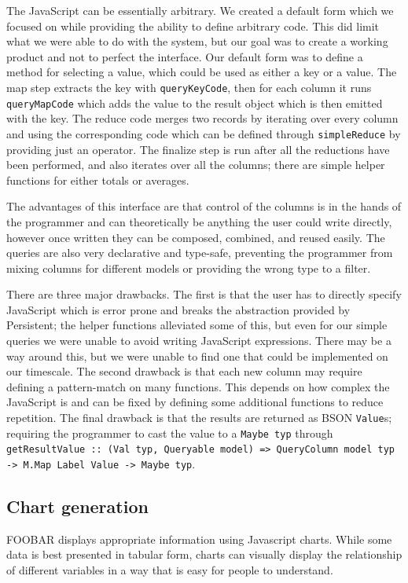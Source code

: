 \documentclass{chi2009}
\newcommand{\code}[1]{\texttt{#1}}
\begin{document}
The JavaScript can be essentially arbitrary.  We created a default form which we focused on while providing the ability to define arbitrary code.  This did limit what we were able to do with the system, but our goal was to create a working product and not to perfect the interface.  Our default form was to define a method for selecting a value, which could be used as either a key or a value.  The map step extracts the key with \code{queryKeyCode}, then for each column it runs \code{queryMapCode} which adds the value to the result object which is then emitted with the key.  The reduce code merges two records by iterating over every column and using the corresponding code which can be defined through \code{simpleReduce} by providing just an operator.  The finalize step is run after all the reductions have been performed, and also iterates over all the columns; there are simple helper functions for either totals or averages.

The advantages of this interface are that control of the columns is in the hands of the programmer and can theoretically be anything the user could write directly, however once written they can be composed, combined, and reused easily.  The queries are also very declarative and type-safe, preventing the programmer from mixing columns for different models or providing the wrong type to a filter.

There are three major drawbacks.  The first is that the user has to directly specify JavaScript which is error prone and breaks the abstraction provided by Persistent; the helper functions alleviated some of this, but even for our simple queries we were unable to avoid writing JavaScript expressions.  There may be a way around this, but we were unable to find one that could be implemented on our timescale.  The second drawback is that each new column may require defining a pattern-match on many functions.  This depends on how complex the JavaScript is and can be fixed by defining some additional functions to reduce repetition.  The final drawback is that the results are returned as BSON \code{Value}s; requiring the programmer to cast the value to a \code{Maybe typ} through \code{getResultValue :: (Val typ, Queryable model) => QueryColumn model typ -> M.Map Label Value -> Maybe typ}.

\subsection{Chart generation}

FOOBAR displays appropriate information using Javascript charts. While some data is best presented in tabular form, charts can visually display the relationship of different variables in a way that is easy for people to understand.
\end{document}
